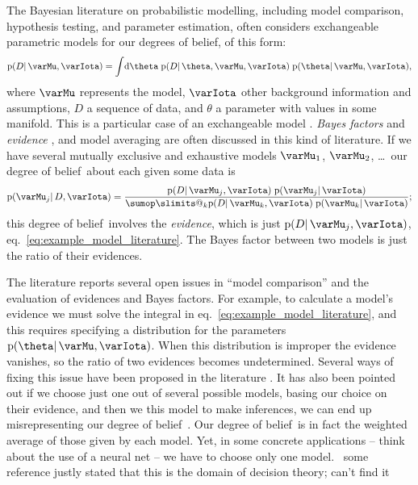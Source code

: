 \documentclass[\ifafour a4paper,12pt,\else a5paper,10pt,\fi%
onecolumn,oneside,article,%
british%
]{memoir}
\makeatletter
\theoremstyle{remark}
\theoremstyle{innote}
\def\sum{\DOTSI\sumop\slimits@}
\newcommand*{\citep}{\parencites}
\newcommand*{\di}{\mathrm{d}}%
\newcommand*{\pf}{\mathrm{p}}%
\renewcommand*{\|}{\mathpunct{|}}
\newcommand*{\chap}{ch.}%
\newcommand*{\eqn}{eq.}%
\newcommand*{\puzzle}{\maltese}
\newcommand{\mynote}[1]{ {\color{notecolour}\puzzle\ #1}}
\newcommand*{\dob}{degree of belief}
\newcommand*{\dobs}{degrees of belief}
\newcommand*{\yM}{\varMu}
\newcommand*{\yI}{\varIota}
\newcommand*{\yD}{D}
\newcommand*{\yHm}{\yM}
\makeatother
\begin{document}
The Bayesian literature on probabilistic modelling, including model
comparison, hypothesis testing, and parameter estimation, often considers
exchangeable parametric models for our \dobs, of this form:
\begin{equation}
  \label{eq:example_model_literature}
  \pf(\yD \| \yHm, \yI) =
  \int\!\di\theta\; \pf(\yD \| \theta,\yHm,\yI)\;
  \pf(\theta \| \yHm, \yI),
\end{equation}
where $\yHm$ represents the model, $\yI$ other background information and
assumptions, $\yD$ a sequence of data, and $\theta$ a parameter with values
in some manifold. This is a particular case of an exchangeable model
\citep[\chap~4]{bernardoetal1994_r2000}. \emph{Bayes factors} and
\emph{evidence} \citep{good1985,mackay1992,kass1993,kassetal1995}, and
model averaging
\citep{draper1993_r2005,chatfield1995,draper1995,hoetingetal1999} are often
discussed in this kind of literature. If we have several mutually exclusive
and exhaustive models $\yHm_1$, $\yHm_2$, \dots\ our \dob\ about each given
some data is
\begin{equation}
  \label{eq:plaus_model}
  \pf(\yHm_j \| \yD, \yI) =
  \frac{
  \pf(\yD \| \yHm_j, \yI)\; \pf(\yHm_j \| \yI)
  }{
  \sum_k \pf(\yD \| \yHm_k, \yI)\; \pf(\yHm_k \| \yI)
  };
\end{equation}
this \dob\ involves the \emph{evidence}, which is just
$\pf(\yD \| \yHm_j, \yI)$, \eqn~\eqref{eq:example_model_literature}. The
Bayes factor between two models is just the ratio of their evidences.

The literature reports several open issues in \enquote{model comparison}
and the evaluation of evidences and Bayes factors. For example, to
calculate a model's evidence we must solve the integral in
\eqn~\eqref{eq:example_model_literature}, and this requires specifying a
distribution for the parameters $\pf(\theta \| \yHm, \yI)$. When this
distribution is improper the evidence vanishes, so the ratio of two
evidences becomes undetermined. Several ways of fixing this issue have been
proposed in the literature
\citep{kassetal1995,ohagan1995,bergeretal1996,desantisetal1997,bergeretal1998}.
It has also been pointed out if we choose just one out of several possible
models, basing our choice on their evidence, and then we this model to make
inferences, we can end up misrepresenting our \dob\
\citep{draper1993_r2005,chatfield1995,draper1995,hoetingetal1999}. Our
\dob\ is in fact the weighted average of those given by each model. Yet, in
some concrete applications -- think about the use of a neural net -- we
have to choose only one model. \mynote{some reference justly stated that
  this is the domain of decision theory; can't find it}
\end{document}

